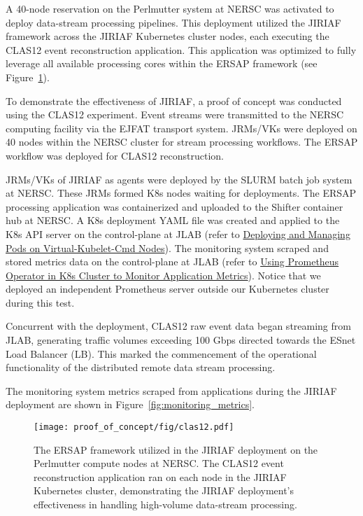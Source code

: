 A 40-node reservation on the Perlmutter system at NERSC was activated to deploy data-stream processing pipelines. This deployment utilized the JIRIAF framework across the JIRIAF Kubernetes cluster nodes, each executing the CLAS12 event reconstruction application. This application was optimized to fully leverage all available processing cores within the ERSAP framework (see Figure~\ref{fig:ersap_framework}).

To demonstrate the effectiveness of JIRIAF, a proof of concept was conducted using the CLAS12 experiment. Event streams were transmitted to the NERSC computing facility via the EJFAT transport system. JRMs/VKs were deployed on 40 nodes within the NERSC cluster for stream processing workflows. The ERSAP workflow was deployed for CLAS12 reconstruction.

JRMs/VKs of JIRIAF as agents were deployed by the SLURM batch job system at NERSC. These JRMs formed K8s nodes waiting for deployments. The ERSAP processing application was containerized and uploaded to the Shifter container hub at NERSC. A K8s deployment YAML file was created and applied to the K8s API server on the control-plane at JLAB (refer to \hyperref[deploying-pods]{Deploying and Managing Pods on Virtual-Kubelet-Cmd Nodes}). The monitoring system scraped and stored metrics data on the control-plane at JLAB (refer to \hyperref[prometheus-operator]{Using Prometheus Operator in K8s Cluster to Monitor Application Metrics}). Notice that we deployed an independent Prometheus server outside our Kubernetes cluster during this test.

Concurrent with the deployment, CLAS12 raw event data began streaming from JLAB, generating traffic volumes exceeding 100 Gbps directed towards the ESnet Load Balancer (LB). This marked the commencement of the operational functionality of the distributed remote data stream processing.

The monitoring system metrics scraped from applications during the JIRIAF deployment are shown in Figure~\ref{fig:monitoring_metrics}.

\begin{figure}[h]
    \centering
    \texttt{[image: proof\_of\_concept/fig/clas12.pdf]}
    \caption{The ERSAP framework utilized in the JIRIAF deployment on the Perlmutter compute nodes at NERSC. The CLAS12 event reconstruction application ran on each node in the JIRIAF Kubernetes cluster, demonstrating the JIRIAF deployment's effectiveness in handling high-volume data-stream processing.}
    \label{fig:ersap_framework}
\end{figure}

